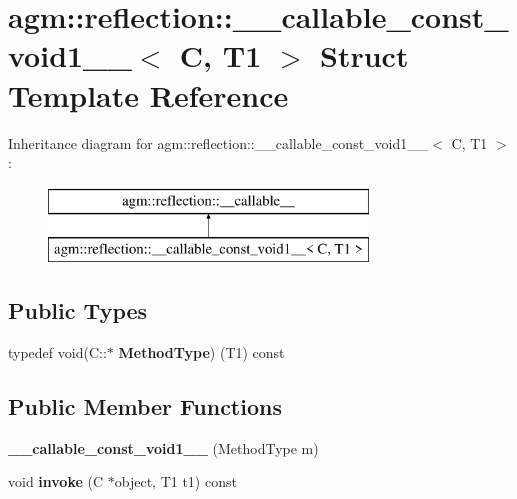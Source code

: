 \hypertarget{structagm_1_1reflection_1_1____callable__const__void1____}{}\section{agm\+:\+:reflection\+:\+:\+\_\+\+\_\+callable\+\_\+const\+\_\+void1\+\_\+\+\_\+$<$ C, T1 $>$ Struct Template Reference}
\label{structagm_1_1reflection_1_1____callable__const__void1____}
Inheritance diagram for agm\+:\+:reflection\+:\+:\+\_\+\+\_\+callable\+\_\+const\+\_\+void1\+\_\+\+\_\+$<$ C, T1 $>$\+:\begin{figure}[H]
\begin{center}
\leavevmode
\includegraphics[height=2.000000cm]{structagm_1_1reflection_1_1____callable__const__void1____}
\end{center}
\end{figure}
\subsection*{Public Types}
\begin{DoxyCompactItemize}
\item 
typedef void(C\+::$\ast$ {\bfseries Method\+Type}) (T1) const \hypertarget{structagm_1_1reflection_1_1____callable__const__void1_____acf6aee47e8d7a661676b59160053a0af}{}\label{structagm_1_1reflection_1_1____callable__const__void1_____acf6aee47e8d7a661676b59160053a0af}

\end{DoxyCompactItemize}
\subsection*{Public Member Functions}
\begin{DoxyCompactItemize}
\item 
{\bfseries \+\_\+\+\_\+callable\+\_\+const\+\_\+void1\+\_\+\+\_\+} (Method\+Type m)\hypertarget{structagm_1_1reflection_1_1____callable__const__void1_____a18721ddffc34fd299cc55d9ad89df2fd}{}\label{structagm_1_1reflection_1_1____callable__const__void1_____a18721ddffc34fd299cc55d9ad89df2fd}

\item 
void {\bfseries invoke} (C $\ast$object, T1 t1) const \hypertarget{structagm_1_1reflection_1_1____callable__const__void1_____ac8c7b03d741b1b85ac5bba23650db705}{}\label{structagm_1_1reflection_1_1____callable__const__void1_____ac8c7b03d741b1b85ac5bba23650db705}

\end{DoxyCompactItemize}
